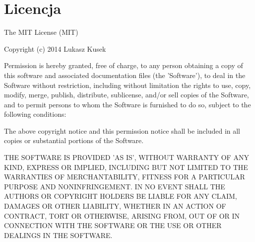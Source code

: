 \chapter{Licencja}

The MIT License (MIT)

\medskip

Copyright (c) 2014 Lukasz Kusek

\medskip

Permission is hereby granted, free of charge, to any person obtaining a copy of
this software and associated documentation files (the 'Software'), to deal in
the Software without restriction, including without limitation the rights to
use, copy, modify, merge, publish, distribute, sublicense, and/or sell copies of
the Software, and to permit persons to whom the Software is furnished to do so,
subject to the following conditions:

\medskip

The above copyright notice and this permission notice shall be included in all
copies or substantial portions of the Software.

\medskip

THE SOFTWARE IS PROVIDED 'AS IS', WITHOUT WARRANTY OF ANY KIND, EXPRESS OR
IMPLIED, INCLUDING BUT NOT LIMITED TO THE WARRANTIES OF MERCHANTABILITY, FITNESS
FOR A PARTICULAR PURPOSE AND NONINFRINGEMENT. IN NO EVENT SHALL THE AUTHORS OR
COPYRIGHT HOLDERS BE LIABLE FOR ANY CLAIM, DAMAGES OR OTHER LIABILITY, WHETHER
IN AN ACTION OF CONTRACT, TORT OR OTHERWISE, ARISING FROM, OUT OF OR IN
CONNECTION WITH THE SOFTWARE OR THE USE OR OTHER DEALINGS IN THE SOFTWARE.
